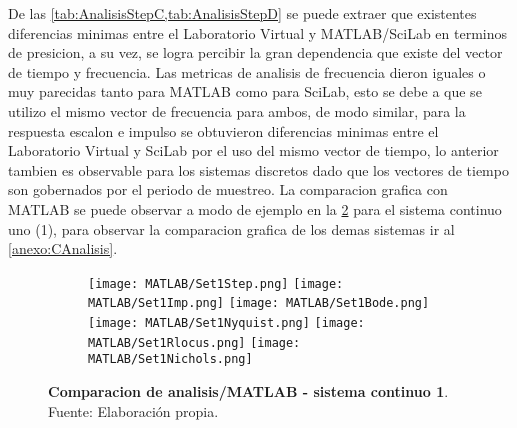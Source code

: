         De las \cref{tab:AnalisisStepC,tab:AnalisisStepD} se puede extraer que existentes diferencias minimas  entre el Laboratorio Virtual y MATLAB/SciLab en terminos de presicion, a su vez, se logra percibir la gran dependencia que existe del vector de tiempo y frecuencia. Las metricas de analisis de frecuencia dieron iguales o muy parecidas tanto para MATLAB como para SciLab, esto se debe a que se utilizo el mismo vector de frecuencia para ambos, de modo similar, para la respuesta escalon e impulso se obtuvieron diferencias minimas entre el Laboratorio Virtual y SciLab por el uso del mismo vector de tiempo, lo anterior tambien es observable para los sistemas discretos dado que los vectores de tiempo son gobernados por el periodo de muestreo. La comparacion grafica con MATLAB se puede observar a modo de ejemplo en la \cref{fig:Set1} para el sistema continuo uno (1), para observar la comparacion grafica de los demas sistemas ir al \ref{anexo:CAnalisis}.

        \begin{figure}[htb]
            \centering
            \begin{subfigure}[t]{0.99\textwidth}
                \centering
                \texttt{[image: MATLAB/Set1Step.png]}
                \texttt{[image: MATLAB/Set1Imp.png]}
                \texttt{[image: MATLAB/Set1Bode.png]}
                \texttt{[image: MATLAB/Set1Nyquist.png]}
                \texttt{[image: MATLAB/Set1Rlocus.png]}
                \texttt{[image: MATLAB/Set1Nichols.png]}
                \label{fig:Set1sub}
            \end{subfigure}
            \caption[Comparacion de analisis/MATLAB - sistema continuo 1]{\textbf{Comparacion de analisis/MATLAB - sistema continuo 1}. Fuente: Elaboración propia. \label{fig:Set1}}
        \end{figure}

            
            
            